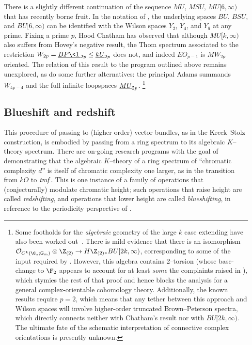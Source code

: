 There is a slightly different continuation of the sequence \(MU\), \(MSU\), \(MU[6, \infty)\) that has recently borne fruit.
In the notation of , the underlying spaces \(BU\), \(BSU\), and \(BU[6, \infty)\) can be identified with the Wilson spaces \(Y_2\), \(Y_4\), and \(Y_6\) at any prime.
Fixing a prime \(p\), Hood Chatham has observed that although \(MU[k, \infty)\) also suffers from Hovey's negative result, the Thom spectrum associated to the restriction \(W_{2p} = \OS{BP\<1\>}{2p} \le \OS{kU}{2p}\) does not, and indeed \(EO_{p-1}\) is \(MW_{2p}\)--oriented.
The relation of this result to the program outlined above remains unexplored, as do some further alternatives: the principal Adams summands $W_{4p-4}$ and the full infinite loopspaces $\OS{MU}{2p}$.%
\footnote{%
Some footholds for the \emph{algebraic} geometry of the large \(k\) case extending  have also been worked out~\cite{HLP}.
There is mild evidence that there is an isomorphism $\sheaf O_{C^k(\G_a; \Gm)} \otimes \Z_{(2)} \to H\Z_{(2)}{}_* BU[2k, \infty)$, corresponding to some of the input required by .
However, this algebra contains \(2\)--torsion (whose base-change to \(\F_2\) appears to account for at least \emph{some} the complaints raised in \cite[Remark 8.1]{HLP}), which stymies the rest of that proof and hence blocks the analysis for a general complex-orientable cohomology theory.
Additionally, the known results require \(p = 2\), which means that any tether between this approach and Wilson spaces will involve higher-order truncated Brown--Peterson spectra, which directly connects neither with Chatham's result nor with \(BU[2k, \infty)\).
The ultimate fate of the schematic interpretation of connective complex orientations is presently unknown.
}








\subsection*{Blueshift and redshift}

This procedure of passing to (higher-order) vector bundles, as in the Kreck--Stolz construction, is embodied by passing from a ring spectrum to its algebraic \(K\)--theory spectrum.
There are on-going research programs with the goal of demonstrating that the algebraic \(K\)--theory of a ring spectrum of ``chromatic complexity \(d\)'' is itself of chromatic complexity one larger, as in the transition from \(kO\) to \(\mathit{tmf}\).
This is one instance of a family of operations that (conjecturally) modulate chromatic height; such operations that raise height are called \textit{redshifting}, and operations that lower height are called \textit{blueshifting}, in reference to the periodicity perspective of .

